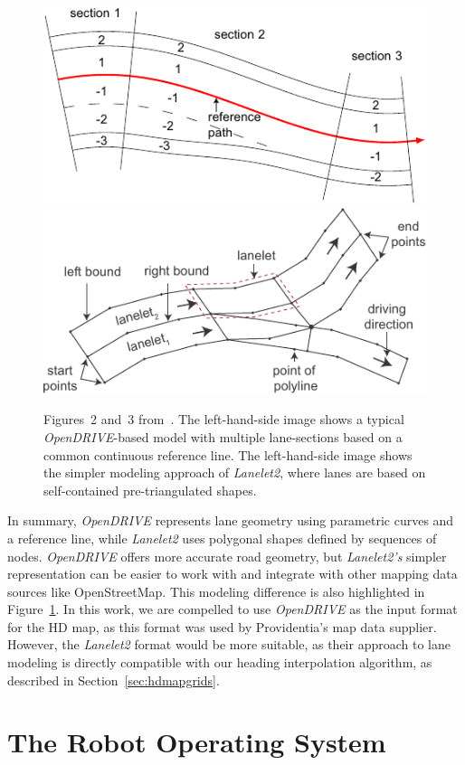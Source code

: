 \begin{figure}[htb]
    \includegraphics[width=0.49 \linewidth]{figures/opendrive_to_lanelet_fig_2_-cropped}
    \includegraphics[width=0.49 \linewidth]{figures/opendrive_to_lanelet_fig_3-cropped}
    \caption{Figures~2 and~3 from~\cite{althoff2018automatic}. The left-hand-side image shows a typical \textit{OpenDRIVE}-based model with multiple lane-sections based on a common continuous reference line. The left-hand-side image shows the simpler modeling approach of \textit{Lanelet2}, where lanes are based on self-contained pre-triangulated shapes.}
    \label{fig:opendrive-lanlet}
\end{figure}

In summary, \textit{OpenDRIVE} represents lane geometry using parametric curves and a reference line, while \textit{Lanelet2} uses polygonal shapes defined by sequences of nodes.
\textit{OpenDRIVE} offers more accurate road geometry, but \textit{Lanelet2's} simpler representation can be easier to work with and integrate with other mapping data sources like OpenStreetMap. This modeling difference is also highlighted in Figure~\ref{fig:opendrive-lanlet}.
In this work, we are compelled to use \textit{OpenDRIVE} as the input format for the HD map, as this format was used by Providentia's map data supplier.
However, the \textit{Lanelet2} format would be more suitable, as their approach to lane modeling is directly compatible with our heading interpolation algorithm, as described in Section~\ref{sec:hdmapgrids}.


\section{The Robot Operating System}
\label{sec:ros}

